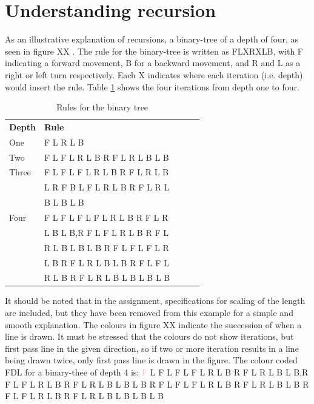 \documentclass[titlepage]{article}
\newcommand{\pink}{\textcolor{pink}}
\begin{document}
\section{Understanding recursion}
As an illustrative explanation of recursions, a binary-tree of a depth of four, as seen in figure XX . The rule for the binary-tree is written as FLXRXLB, with F indicating a forward movement, B for a backward movement, and R and L as a right or left turn respectively. Each X indicates where each iteration (i.e. depth) would insert the rule. Table \ref{table:binary}  shows the four iterations from depth one to four. 
\begin{table}[H]
\centering
\caption{Rules for the binary tree}
\label{table:binary}
\begin{tabular}{lllll}
  \textbf{Depth} & \textbf{Rule}\\
  One   & F L R L B \\
  Two   & F L F L R L B R F L R L B L B\\
  Three &F L F L F L R L B R F L R L B \\
        & L R F B L F L R L B R F L R L  \\
  &B L B L B\\
  Four  & F L F L F L F L R L B R F L R\\
   & L B L B,R F L F L R L B R F L\\
   & R L B L B L B R F L F L F L R\\
   & L B R F L R L B L B R F L F L\\
   & R L B R F L R L B L B L B L B\\
  \end{tabular}
\end{table}
It should be noted that in the assignment, specifications for scaling of the length are included, but they have been removed from this example for a simple and smooth explanation. The colours in figure XX indicate the succession of when a line is drawn. It must be stressed that the colours do not show iterations, but first pass line in the given direction, so if two or more iteration results in a line being drawn twice, only first pass line is drawn in the figure. 
The colour coded FDL for a binary-thee of depth 4 is:
\pink{F} L F L F L F L R L B R F L R L B L B,R F L F L R L B R F L R L B L B L B R F L F L F L R L B R F L R L B L B R F L F L R L B R F L R L B L B L B L B
\end{document}
